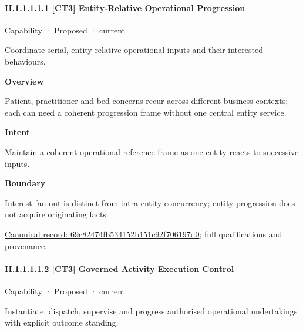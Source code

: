 \paragraph*{II.1.1.1.1.1 [CT3] Entity-Relative Operational Progression}
\label{navigation:II.1.1.1.1.1}

\label{element:69c82474fb534152b151c92f706197d0}
{\small Capability · Proposed · current}\par

Coordinate serial, entity-relative operational inputs and their interested behaviours.



\textbf{Overview}



Patient, practitioner and bed concerns recur across different business contexts; each can need a coherent progression frame without one central entity service.



\textbf{Intent}



Maintain a coherent operational reference frame as one entity reacts to successive inputs.



\textbf{Boundary}



Interest fan-out is distinct from intra-entity concurrency; entity progression does not acquire originating facts.


{\footnotesize \href{../../../../continuum/strategy/capability/69c82474fb534152b151c92f706197d0.md}{Canonical record: 69c82474fb534152b151c92f706197d0}; full qualifications and provenance.}\par
\paragraph*{II.1.1.1.1.2 [CT3] Governed Activity Execution Control}
\label{navigation:II.1.1.1.1.2}

\label{element:1e351cdfdc1045e384c3bd768eed8e80}
{\small Capability · Proposed · current}\par

Instantiate, dispatch, supervise and progress authorised operational undertakings with explicit outcome standing.



